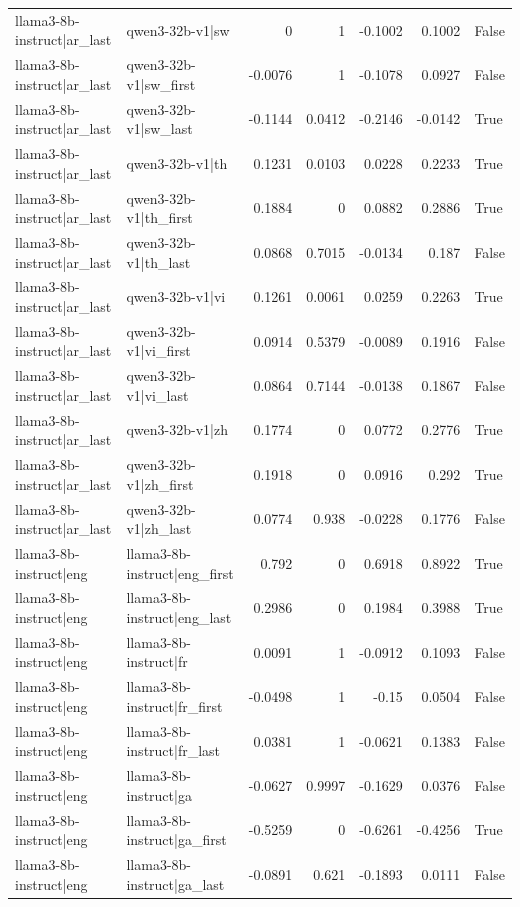 \begin{table}
\begin{tabular}{l l r r r r l}
llama3-8b-instruct|ar_last & qwen3-32b-v1|sw & 0 & 1 & -0.1002 & 0.1002 & False \\
llama3-8b-instruct|ar_last & qwen3-32b-v1|sw_first & -0.0076 & 1 & -0.1078 & 0.0927 & False \\
llama3-8b-instruct|ar_last & qwen3-32b-v1|sw_last & -0.1144 & 0.0412 & -0.2146 & -0.0142 & True \\
llama3-8b-instruct|ar_last & qwen3-32b-v1|th & 0.1231 & 0.0103 & 0.0228 & 0.2233 & True \\
llama3-8b-instruct|ar_last & qwen3-32b-v1|th_first & 0.1884 & 0 & 0.0882 & 0.2886 & True \\
llama3-8b-instruct|ar_last & qwen3-32b-v1|th_last & 0.0868 & 0.7015 & -0.0134 & 0.187 & False \\
llama3-8b-instruct|ar_last & qwen3-32b-v1|vi & 0.1261 & 0.0061 & 0.0259 & 0.2263 & True \\
llama3-8b-instruct|ar_last & qwen3-32b-v1|vi_first & 0.0914 & 0.5379 & -0.0089 & 0.1916 & False \\
llama3-8b-instruct|ar_last & qwen3-32b-v1|vi_last & 0.0864 & 0.7144 & -0.0138 & 0.1867 & False \\
llama3-8b-instruct|ar_last & qwen3-32b-v1|zh & 0.1774 & 0 & 0.0772 & 0.2776 & True \\
llama3-8b-instruct|ar_last & qwen3-32b-v1|zh_first & 0.1918 & 0 & 0.0916 & 0.292 & True \\
llama3-8b-instruct|ar_last & qwen3-32b-v1|zh_last & 0.0774 & 0.938 & -0.0228 & 0.1776 & False \\
llama3-8b-instruct|eng & llama3-8b-instruct|eng_first & 0.792 & 0 & 0.6918 & 0.8922 & True \\
llama3-8b-instruct|eng & llama3-8b-instruct|eng_last & 0.2986 & 0 & 0.1984 & 0.3988 & True \\
llama3-8b-instruct|eng & llama3-8b-instruct|fr & 0.0091 & 1 & -0.0912 & 0.1093 & False \\
llama3-8b-instruct|eng & llama3-8b-instruct|fr_first & -0.0498 & 1 & -0.15 & 0.0504 & False \\
llama3-8b-instruct|eng & llama3-8b-instruct|fr_last & 0.0381 & 1 & -0.0621 & 0.1383 & False \\
llama3-8b-instruct|eng & llama3-8b-instruct|ga & -0.0627 & 0.9997 & -0.1629 & 0.0376 & False \\
llama3-8b-instruct|eng & llama3-8b-instruct|ga_first & -0.5259 & 0 & -0.6261 & -0.4256 & True \\
llama3-8b-instruct|eng & llama3-8b-instruct|ga_last & -0.0891 & 0.621 & -0.1893 & 0.0111 & False \\

\end{tabular}
\end{table}
